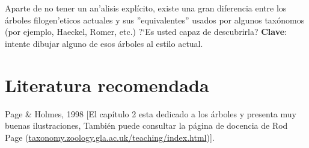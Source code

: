 Aparte de no tener un an'alisis expl\'icito, existe una gran diferencia entre los \'arboles filogen'eticos actuales y sus ''equivalentes'' usados por algunos tax\'onomos (por ejemplo, Haeckel, Romer, etc.) ?`Es usted capaz de descubrirla? \textbf{Clave}: intente dibujar alguno de esos \'arboles al estilo actual.

\section*{Literatura recomendada}

Page \& Holmes, 1998 [El cap\'itulo 2 esta dedicado a los \'arboles y presenta muy buenas ilustraciones, Tambi\'en puede consultar la p\'agina de docencia de Rod Page (\url{taxonomy.zoology.gla.ac.uk/teaching/index.html})].

